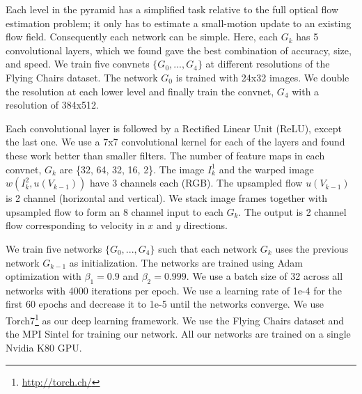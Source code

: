 \documentclass[10pt,twocolumn,letterpaper]{article}
\begin{document}
Each level in the pyramid has a simplified task relative to the full optical flow estimation problem; it only has to estimate a small-motion update to an existing flow field.
Consequently each network can be simple.
Here, each $G_k$ has 5 convolutional layers, which we found gave the best combination of accuracy, size, and speed.
We train five convnets $\{G_0, ..., G_4 \}$ at different resolutions of the Flying Chairs dataset. The network $G_0$ is trained with 24x32 images. We double the resolution at each lower level and finally train the convnet, $G_4$ with a resolution of 384x512.

Each convolutional layer is followed by a Rectified Linear Unit (ReLU), except the last one. 
We use a 7x7 convolutional kernel for each of the layers and found these work better than smaller filters.
The number of feature maps in each convnet, $G_k$ are \{32, 64, 32, 16, 2\}. The image $I^1_k$ and the warped image $w(I^2_k, u(V_{k-1}))$ have 3 channels each (RGB). The upsampled flow $u(V_{k-1})$ is 2 channel (horizontal and vertical).  
We stack image frames together with upsampled flow to form an 8 channel input to each $G_k$. The output is 2 channel flow corresponding to velocity in $x$ and $y$ directions. 


We train five networks $\{G_0, ..., G_4 \}$ such that each network $G_k$ uses the previous network $G_{k-1}$ as initialization. The networks are trained using Adam \cite{kingma2014adam} optimization with $\beta_1 = 0.9$ and $\beta_2 = 0.999$. We use a batch size of 32 across all networks with 4000 iterations per epoch. We use a learning rate of 1e-4 for the first 60 epochs and decrease it to 1e-5 until the networks converge. We use Torch7\footnote{\url{http://torch.ch/}} as our deep learning framework. We use the Flying Chairs \cite{dosovitskiy2015flownet} dataset and the MPI Sintel \cite{Butler:ECCV:2012} for training our network. 
All our networks are trained on a single Nvidia K80 GPU.
\end{document}
